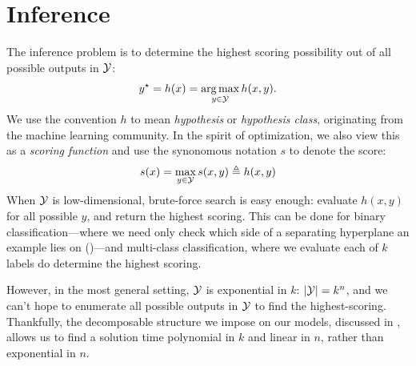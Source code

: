 \section{Inference}
\label{sec:inference}
The inference problem is to determine the highest scoring possibility out of 
all possible outputs in $\mathcal{Y}$: 
\begin{equation} 
y^\star = h(x) = \mathop{\arg\max}_{y \in \mathcal{Y}} h(x,y).  
\end{equation}
We use the convention $h$ to mean {\em hypothesis} or {\em hypothesis class}, originating from the machine learning community.  In the spirit of optimization, we also view this as a {\em scoring function} and use the synonomous notation $s$ to denote the score:
\begin{equation} 
s(x) = \max_{y \in \mathcal{Y}} s(x,y) \triangleq h(x,y)
\end{equation}
When $\mathcal{Y}$ is low-dimensional, brute-force search is easy enough: evaluate 
$h(x,y)$ for all possible $y$, and return the highest scoring.  This can be 
done for binary classification---where we need only check which side of a 
separating hyperplane an example lies on ()---and 
multi-class classification, where we evaluate each of $k$ labels do determine 
the highest scoring.


However, in the most general setting, $\mathcal{Y}$ is exponential in 
$k$: $|\mathcal{Y}| = k^n$, and we can't hope to enumerate all possible outputs in 
$\mathcal{Y}$ to find the highest-scoring.  Thankfully, the decomposable structure we 
impose on our models, discussed in , allows us to find a solution 
time polynomial in $k$ and linear in $n$, rather than exponential in $n$.
 

